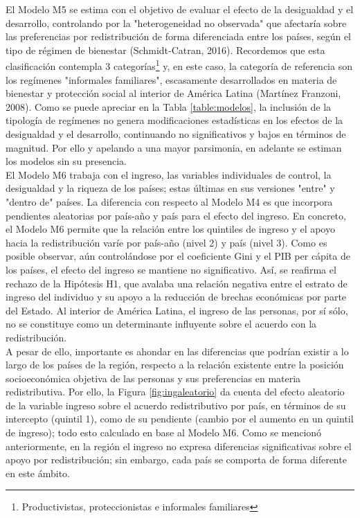\documentclass[12pt,letterpaper]{article}
\begin{document}
El Modelo M5 se estima con el objetivo de evaluar el efecto de la desigualdad y el desarrollo, controlando por la "heterogeneidad no observada" que afectaría sobre las preferencias por redistribución de forma diferenciada entre los países, según el tipo de régimen de bienestar (Schmidt-Catran, 2016). Recordemos que esta clasificación contempla 3 categorías\footnote{Productivistas, proteccionistas e informales familiares} y, en este caso, la categoría de referencia son los regímenes "informales familiares", escasamente desarrollados en materia de bienestar y protección social al interior de América Latina (Martínez Franzoni, 2008). Como se puede apreciar en la Tabla \ref{table:modelos}, la inclusión de la tipología de regímenes no genera modificaciones estadísticas en los efectos de la desigualdad y el desarrollo, continuando no significativos y bajos en términos de magnitud. Por ello y apelando a una mayor parsimonia, en adelante se estiman los modelos sin su presencia.\\

El Modelo M6 trabaja con el ingreso, las variables individuales de control, la desigualdad y la riqueza de los países; estas últimas en sus versiones "entre" y "dentro de" países. La diferencia con respecto al Modelo M4 es que incorpora pendientes aleatorias por país-año y país para el efecto del ingreso. En concreto, el Modelo M6 permite que la relación entre los quintiles de ingreso y el apoyo hacia la redistribución varíe por país-año (nivel 2) y país (nivel 3). Como es posible observar, aún controlándose por el coeficiente Gini y el PIB per cápita de los países, el efecto del ingreso se mantiene no significativo. Así, se reafirma el rechazo de la Hipótesis H1, que avalaba una relación negativa entre el estrato de ingreso del individuo y su apoyo a la reducción de brechas económicas por parte del Estado. Al interior de América Latina, el ingreso de las personas, por sí sólo, no se constituye como un determinante influyente sobre el acuerdo con la redistribución.\\

A pesar de ello, importante es ahondar en las diferencias que podrían existir a lo largo de los países de la región, respecto a la relación existente entre la posición socioeconómica objetiva de las personas y sus preferencias en materia redistributiva. Por ello, la Figura \ref{fig:ingaleatorio} da cuenta del efecto aleatorio de la variable ingreso sobre el acuerdo redistributivo por país, en términos de su intercepto (quintil 1), como de su pendiente (cambio por el aumento en un quintil de ingreso); todo esto calculado en base al Modelo M6. Como se mencionó anteriormente, en la región el ingreso no expresa diferencias significativas sobre el apoyo por redistribución; sin embargo, cada país se comporta de forma diferente en este ámbito. \\
\end{document}
